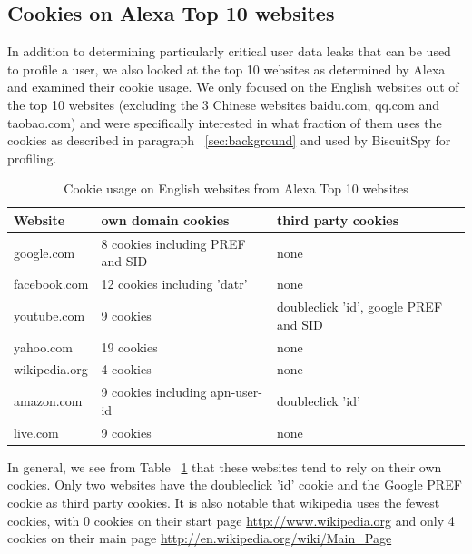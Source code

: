 \subsection{Cookies on Alexa Top 10 websites}

In addition to determining particularly critical user data leaks that can be used to profile a user, we also looked at the top 10 websites as determined by Alexa and examined their cookie usage. We only focused on the English websites out of the top 10 websites (excluding the 3 Chinese websites baidu.com, qq.com and taobao.com) and were specifically interested in what fraction of them uses the cookies as described in paragraph ~\ref{sec:background} and used by BiscuitSpy for profiling.

\begin{table}[h]
\centering

\begin{center}
    \begin{tabular}{ | l | p{6cm} | p{6cm} |}
    \hline
    Website & own domain cookies & third party cookies \\ \hline

google.com & 8 cookies including PREF and SID & none \\ \hline
facebook.com & 12 cookies including 'datr' & none \\ \hline
youtube.com & 9 cookies & doubleclick 'id', google PREF and SID \\ \hline
yahoo.com & 19 cookies & none \\ \hline
wikipedia.org & 4 cookies & none \\ \hline
amazon.com & 9 cookies including apn-user-id & doubleclick 'id' \\ \hline
live.com & 9 cookies & none \\ \hline

    \end{tabular}
\end{center}

\caption{Cookie usage on English websites from Alexa Top 10 websites}
\label{tab:alexa}

\end{table}


In general, we see from Table ~\ref{tab:alexa} that these websites tend to rely on their own cookies.
Only two websites have the doubleclick 'id' cookie and the Google PREF cookie as third party cookies. It is also notable that wikipedia uses the fewest cookies, with 0 cookies on their start page \url{http://www.wikipedia.org} and only 4 cookies on their main page \url{http://en.wikipedia.org/wiki/Main_Page}
